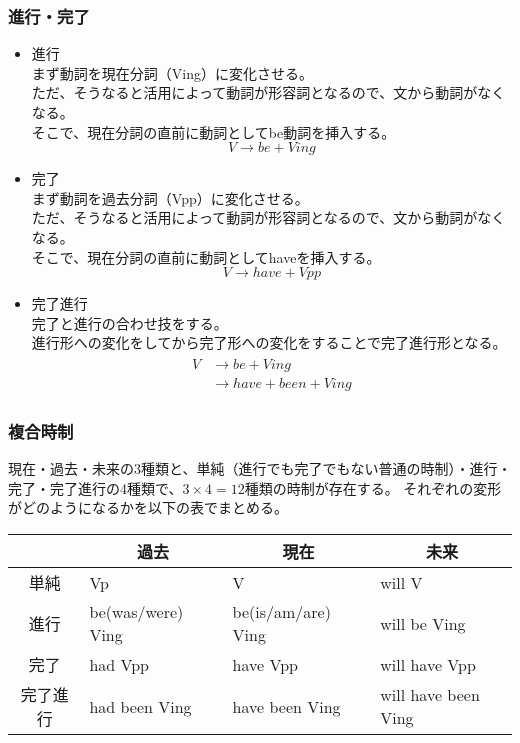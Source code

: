 \subsubsection{進行・完了}

\begin{itemize}
  \item 進行\\
  まず動詞を現在分詞（Ving）に変化させる。\\
  ただ、そうなると活用によって動詞が形容詞となるので、文から動詞がなくなる。\\
  そこで、現在分詞の直前に動詞としてbe動詞を挿入する。\\
  \begin{equation}
    V \rightarrow be + Ving
  \end{equation}
  \item 完了\\
  まず動詞を過去分詞（Vpp）に変化させる。\\
  ただ、そうなると活用によって動詞が形容詞となるので、文から動詞がなくなる。\\
  そこで、現在分詞の直前に動詞としてhaveを挿入する。\\
  \begin{equation}
    V \rightarrow have + Vpp
  \end{equation}
  \item 完了進行\\
  完了と進行の合わせ技をする。\\
  進行形への変化をしてから完了形への変化をすることで完了進行形となる。\\
  \begin{align}
    \begin{aligned}
      V & \rightarrow be + Ving\\
        & \rightarrow have + been + Ving
    \end{aligned}
  \end{align}
\end{itemize}

\subsubsection{複合時制}

現在・過去・未来の3種類と、単純（進行でも完了でもない普通の時制）・進行・完了・完了進行の4種類で、$3 \times 4 = 12$種類の時制が存在する。
それぞれの変形がどのようになるかを以下の表でまとめる。

\begin{table}[h]
  \centering
  \begin{tabular}{clll}
    \hline
     & \multicolumn{1}{c}{過去} & \multicolumn{1}{c}{現在} & \multicolumn{1}{c}{未来}\\
    \hline \hline
    単純 & Vp & V & will V\\
    進行 & be(was/were) Ving & be(is/am/are) Ving & will be Ving\\
    完了 & had Vpp & have Vpp & will have Vpp\\
    完了進行 & had been Ving & have been Ving & will have been Ving\\
    \hline
  \end{tabular}
\end{table}

